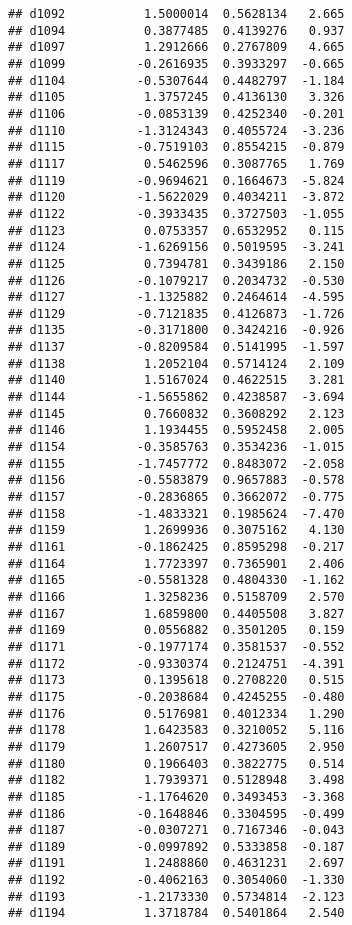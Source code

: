 \documentclass[
]{article}
\begin{document}
\begin{verbatim}
## d1092           1.5000014  0.5628134   2.665
## d1094           0.3877485  0.4139276   0.937
## d1097           1.2912666  0.2767809   4.665
## d1099          -0.2616935  0.3933297  -0.665
## d1104          -0.5307644  0.4482797  -1.184
## d1105           1.3757245  0.4136130   3.326
## d1106          -0.0853139  0.4252340  -0.201
## d1110          -1.3124343  0.4055724  -3.236
## d1115          -0.7519103  0.8554215  -0.879
## d1117           0.5462596  0.3087765   1.769
## d1119          -0.9694621  0.1664673  -5.824
## d1120          -1.5622029  0.4034211  -3.872
## d1122          -0.3933435  0.3727503  -1.055
## d1123           0.0753357  0.6532952   0.115
## d1124          -1.6269156  0.5019595  -3.241
## d1125           0.7394781  0.3439186   2.150
## d1126          -0.1079217  0.2034732  -0.530
## d1127          -1.1325882  0.2464614  -4.595
## d1129          -0.7121835  0.4126873  -1.726
## d1135          -0.3171800  0.3424216  -0.926
## d1137          -0.8209584  0.5141995  -1.597
## d1138           1.2052104  0.5714124   2.109
## d1140           1.5167024  0.4622515   3.281
## d1144          -1.5655862  0.4238587  -3.694
## d1145           0.7660832  0.3608292   2.123
## d1146           1.1934455  0.5952458   2.005
## d1154          -0.3585763  0.3534236  -1.015
## d1155          -1.7457772  0.8483072  -2.058
## d1156          -0.5583879  0.9657883  -0.578
## d1157          -0.2836865  0.3662072  -0.775
## d1158          -1.4833321  0.1985624  -7.470
## d1159           1.2699936  0.3075162   4.130
## d1161          -0.1862425  0.8595298  -0.217
## d1164           1.7723397  0.7365901   2.406
## d1165          -0.5581328  0.4804330  -1.162
## d1166           1.3258236  0.5158709   2.570
## d1167           1.6859800  0.4405508   3.827
## d1169           0.0556882  0.3501205   0.159
## d1171          -0.1977174  0.3581537  -0.552
## d1172          -0.9330374  0.2124751  -4.391
## d1173           0.1395618  0.2708220   0.515
## d1175          -0.2038684  0.4245255  -0.480
## d1176           0.5176981  0.4012334   1.290
## d1178           1.6423583  0.3210052   5.116
## d1179           1.2607517  0.4273605   2.950
## d1180           0.1966403  0.3822775   0.514
## d1182           1.7939371  0.5128948   3.498
## d1185          -1.1764620  0.3493453  -3.368
## d1186          -0.1648846  0.3304595  -0.499
## d1187          -0.0307271  0.7167346  -0.043
## d1189          -0.0997892  0.5333858  -0.187
## d1191           1.2488860  0.4631231   2.697
## d1192          -0.4062163  0.3054060  -1.330
## d1193          -1.2173330  0.5734814  -2.123
## d1194           1.3718784  0.5401864   2.540

\end{verbatim}
\end{document}
